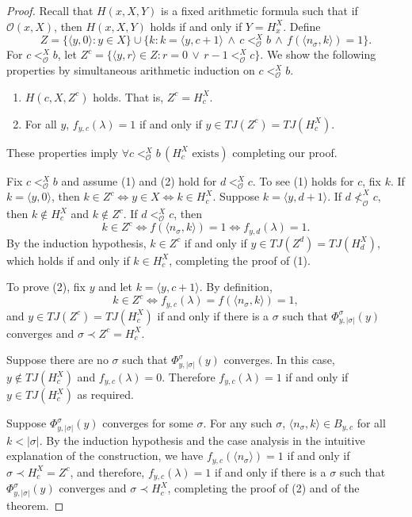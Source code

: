 \documentclass{amsart}
\theoremstyle{definition}
\theoremstyle{remark}
\begin{document}
\begin{proof}
Recall that $H(x,X,Y)$ is a fixed arithmetic formula such that if $\mathcal{O}(x,X)$, then $H(x,X,Y)$ holds if and only if $Y= H_x^X$.  Define
\[
Z = \{ \langle y,0 \rangle : y \in X \} \cup \{ k : k=\langle y,c+1 \rangle \, \wedge \, c <_{\mathcal{O}}^X b \, \wedge \, f(\langle n_\sigma,k \rangle) = 1 \}.
\]
For $c <_{\mathcal{O}}^X b$, let $Z^c = \{ \langle y,r \rangle \in Z : r=0 \, \vee \, r-1 <_{\mathcal{O}}^X c \}$. 
We show the following properties by simultaneous arithmetic induction on $c <_{\mathcal{O}}^X b$.
\begin{enumerate}
\item $H(c,X,Z^c)$ holds. That is, $Z^c = H_c^X$. 
\item For all $y$, $f_{y,c}(\lambda) = 1$ if and only if $y \in TJ(Z^c) = TJ(H_c^X)$.
\end{enumerate} 
These properties imply $\forall c <_{\mathcal{O}}^X b \, (H_c^X \text{ exists})$ completing our proof.

Fix $c <_{\mathcal{O}}^X b$ and assume (1) and (2) hold for $d <_{\mathcal{O}}^X c$. To see (1) holds for $c$, fix $k$. If $k = \langle y,0 \rangle$, then 
$k \in Z^c \Leftrightarrow y \in X \Leftrightarrow k \in H_c^X$. Suppose $k = \langle y,d+1 \rangle$. If $d \not <_{\mathcal{O}}^X c$, then $k \not \in H_c^X$ and 
$k \not \in Z^c$. If $d <_{\mathcal{O}}^X c$, then
\[
k \in Z^c \Leftrightarrow f(\langle n_\sigma,k \rangle) = 1 \Leftrightarrow f_{y,d}(\lambda)=1.
\]
By the induction hypothesis, $k \in Z^c$ if and only if $y \in TJ(Z^d) = TJ(H_d^X)$, which holds if and only if $k \in H_c^X$, completing the proof of (1).

To prove (2), fix $y$ and let $k = \langle y, c+1 \rangle$. By definition, 
\[
k \in Z^c \Leftrightarrow f_{y,c}(\lambda) = f(\langle n_\sigma, k \rangle) = 1, 
\]
and $y \in TJ(Z^c) = TJ(H_c^X)$ if and only if there is a $\sigma$ such that $\Phi_{y,|\sigma|}^{\sigma}(y)$ converges and 
$\sigma \prec Z^c = H_c^X$. 

Suppose there are no $\sigma$ such that $\Phi_{y,|\sigma|}^{\sigma}(y)$ converges. In this case, $y \not \in TJ(H_c^X)$ and $f_{y,c}(\lambda) = 0$. Therefore $f_{y,c}(\lambda) = 1$ if and only if $y \in TJ(H_c^X)$ as required.

Suppose $\Phi_{y,|\sigma|}^{\sigma}(y)$ converges for some $\sigma$. For any such $\sigma$, $\langle n_\sigma, k \rangle \in B_{y,c}$ for all $k < |\sigma|$. 
By the induction hypothesis 
and the case analysis in the intuitive explanation of the construction, we have $f_{y,c}(\langle n_\sigma \rangle) = 1$ if and only if 
$\sigma \prec H_c^X = Z^c$, and therefore, $f_{y,c}(\lambda) = 1$ if and only if there is a $\sigma$ such that $\Phi_{y,|\sigma|}^{\sigma}(y)$ converges and 
$\sigma \prec H_c^X$, completing the proof of (2) and of the theorem. 
\end{proof}
\end{document}
